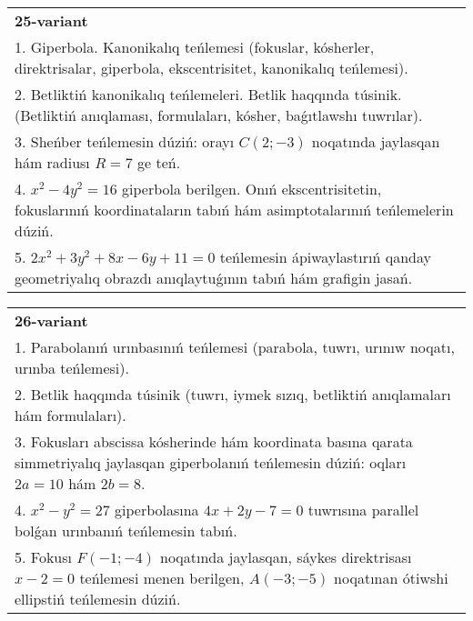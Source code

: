 \documentclass{article}
\begin{document}
\begin{tabular}{m{17cm}}
\textbf{25-variant}\\
1. Giperbola. Kanonikalıq teńlemesi (fokuslar, kósherler, direktrisalar, giperbola, ekscentrisitet, kanonikalıq teńlemesi).\\

2. Betliktiń kanonikalıq teńlemeleri. Betlik haqqında túsinik. (Betliktiń anıqlaması, formulaları, kósher, baǵıtlawshı tuwrılar).\\

3. Sheńber teńlemesin dúziń: orayı $C (2;-3) $ noqatında jaylasqan hám radiusı $R=7$ ge teń.\\

4. $x^{2} - 4y^{2} = 16$ giperbola berilgen. Onıń ekscentrisitetin, fokuslarınıń koordinataların tabıń hám asimptotalarınıń teńlemelerin dúziń.\\

5. $2x^{2} + 3y^{2} + 8x - 6y + 11 = 0$ teńlemesin ápiwaylastırıń qanday geometriyalıq obrazdı anıqlaytuǵının tabıń hám grafigin jasań.
\end{tabular}
\vspace{1cm}


\begin{tabular}{m{17cm}}
\textbf{26-variant}\\
1. Parabolanıń urınbasınıń teńlemesi (parabola, tuwrı, urınıw noqatı, urınba teńlemesi).\\

2. Betlik haqqında túsinik (tuwrı, iymek sızıq, betliktiń anıqlamaları hám formulaları).\\

3. Fokusları abscissa kósherinde hám koordinata basına qarata simmetriyalıq jaylasqan giperbolanıń teńlemesin dúziń: oqları $2 a=10$ hám $2 b=8$.\\

4. $x^{2} - y^{2} = 27$ giperbolasına $4x + 2y - 7 = 0$ tuwrısına parallel bolǵan urınbanıń teńlemesin tabıń.  \\

5. Fokusı $F( - 1; - 4)$ noqatında jaylasqan, sáykes direktrisası $x - 2 = 0$ teńlemesi menen berilgen, $A( - 3; - 5)$ noqatınan ótiwshi ellipstiń teńlemesin dúziń.  
\end{tabular}
\vspace{1cm}
\end{document}
